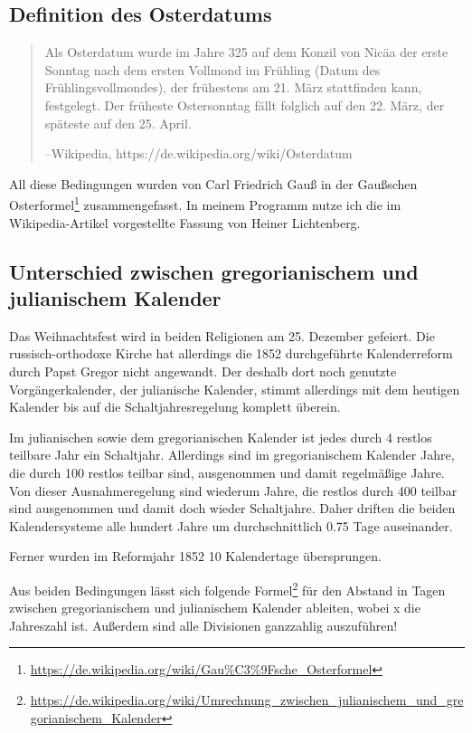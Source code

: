 \subsection{Definition des Osterdatums}
	\begin{quote}
		Als Osterdatum wurde im Jahre 325 auf dem Konzil von Nicäa der erste Sonntag nach dem ersten Vollmond im Frühling (Datum des Frühlingsvollmondes), der frühestens am 21. März stattfinden kann, festgelegt. Der früheste Ostersonntag fällt folglich auf den 22. März, der späteste auf den 25. April.

		\hfill{}--Wikipedia, https://de.wikipedia.org/wiki/Osterdatum
	\end{quote}

	All diese Bedingungen wurden von Carl Friedrich Gauß in der Gaußschen Osterformel\footnote{\url{https://de.wikipedia.org/wiki/Gau\%C3\%9Fsche_Osterformel}} zusammengefasst. In meinem Programm nutze ich die im Wikipedia-Artikel vorgestellte Fassung von Heiner Lichtenberg.
\subsection{Unterschied zwischen gregorianischem und julianischem Kalender}
	Das Weihnachtsfest wird in beiden Religionen am 25. Dezember gefeiert. Die russisch-orthodoxe Kirche hat allerdings die 1852 durchgeführte Kalenderreform durch Papst Gregor nicht angewandt. Der deshalb dort noch genutzte Vorgängerkalender, der julianische Kalender, stimmt allerdings mit dem heutigen Kalender bis auf die Schaltjahresregelung komplett überein.

	Im julianischen sowie dem gregorianischen Kalender ist jedes durch 4 restlos teilbare Jahr ein Schaltjahr. Allerdings sind im gregorianischem Kalender Jahre, die durch 100 restlos teilbar sind, ausgenommen und damit regelmäßige Jahre. Von dieser Ausnahmeregelung sind wiederum Jahre, die restlos durch 400 teilbar sind ausgenommen und damit doch wieder Schaltjahre. Daher driften die beiden Kalendersysteme alle hundert Jahre um durchschnittlich 0.75 Tage auseinander.

	Ferner wurden im Reformjahr 1852 10 Kalendertage übersprungen.

	Aus beiden Bedingungen lässt sich folgende Formel\footnote{\url{https://de.wikipedia.org/wiki/Umrechnung_zwischen_julianischem_und_gregorianischem_Kalender}} für den Abstand in Tagen zwischen gregorianischem und julianischem Kalender ableiten, wobei x die Jahreszahl ist. Außerdem sind  alle Divisionen ganzzahlig auszuführen! 

